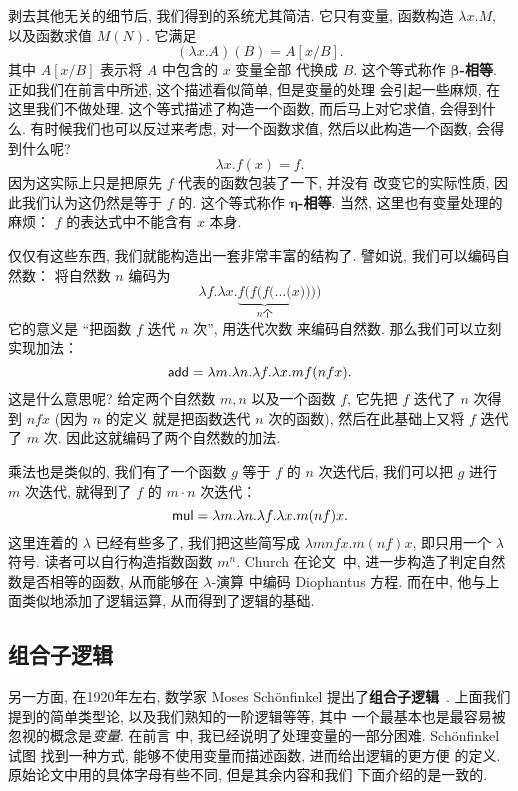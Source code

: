 剥去其他无关的细节后, 我们得到的系统尤其简洁. 它只有变量,
函数构造 \(\lambda x. M\), 以及函数求值 \(M(N)\).
它满足
\[(\lambda x. A)(B) = A[x/B].\]
其中 \(A[x/B]\) 表示将 \(A\) 中包含的 \(x\) 变量全部
代换成 \(B\). 这个等式称作 \textbf{\(\boldsymbol\beta\)-相等}.
正如我们在前言中所述, 这个描述看似简单, 但是变量的处理
会引起一些麻烦, 在这里我们不做处理. 这个等式描述了构造一个函数,
而后马上对它求值, 会得到什么. 有时候我们也可以反过来考虑,
对一个函数求值, 然后以此构造一个函数, 会得到什么呢?
\[\lambda x. f(x) = f.\]
因为这实际上只是把原先 \(f\) 代表的函数包装了一下, 并没有
改变它的实际性质, 因此我们认为这仍然是等于 \(f\) 的.
这个等式称作 \textbf{\(\boldsymbol\eta\)-相等}.
当然, 这里也有变量处理的麻烦： \(f\) 的表达式中不能含有 \(x\) 本身.

仅仅有这些东西, 我们就能构造出一套非常丰富的结构了. 譬如说,
我们可以编码自然数： 将自然数 \(n\) 编码为
\[\lambda f. \lambda x. \underbrace{f(f(f(...(}_{n\text{个}}x))))\]
它的意义是 “把函数 \(f\) 迭代 \(n\) 次”, 用迭代次数
来编码自然数. 那么我们可以立刻实现加法：
\[\textsf{add} = \lambda m. \lambda n. \lambda f. \lambda x. mf(nfx).\]
这是什么意思呢? 给定两个自然数 \(m, n\) 以及一个函数 \(f\),
它先把 \(f\) 迭代了 \(n\) 次得到 \(nfx\) (因为 \(n\) 的定义
就是把函数迭代 \(n\) 次的函数), 然后在此基础上又将
\(f\) 迭代了 \(m\) 次. 因此这就编码了两个自然数的加法.

乘法也是类似的, 我们有了一个函数 \(g\) 等于 \(f\) 的 \(n\)
次迭代后, 我们可以把 \(g\) 进行 \(m\) 次迭代, 就得到了
\(f\) 的 \(m\cdot n\) 次迭代：
\[\textsf{mul} = \lambda m. \lambda n. \lambda f. \lambda x. m(nf)x.\]
这里连着的 \(\lambda\) 已经有些多了, 我们把这些简写成
\(\lambda mnfx. m(nf)x\), 即只用一个 \(\lambda\) 符号.
读者可以自行构造指数函数 \(m^n\). Church 在论文~\cite{church:1936:lambda}中,
进一步构造了判定自然数是否相等的函数, 从而能够在 \(\lambda\)-演算
中编码 Diophantus 方程. 而在\cite{church:1932:untyped}中,
他与上面类似地添加了逻辑运算, 从而得到了逻辑的基础.

\subsection{组合子逻辑}
另一方面, 在1920年左右, 数学家 Moses Sch\"onfinkel 提出了\textbf{组合子逻辑}~\cite{schonfinkel:1924:combinator}.
上面我们提到的简单类型论, 以及我们熟知的一阶逻辑等等, 其中
一个最基本也是最容易被忽视的概念是\emph{变量}. 在前言
中, 我已经说明了处理变量的一部分困难. Sch\"onfinkel 试图
找到一种方式, 能够不使用变量而描述函数, 进而给出逻辑的更方便
的定义. 原始论文中用的具体字母有些不同, 但是其余内容和我们
下面介绍的是一致的.

